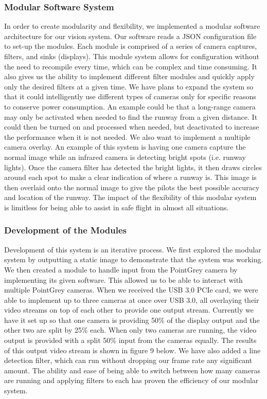 \documentclass[letterpaper,10pt,titlepage]{IEEEtran}
\begin{document}
   \subsubsection{Modular Software System}
   In order to create modularity and flexibility, we implemented a modular software architecture for our vision system. Our software reads a JSON configuration file to set-up the modules. Each module is comprised of a series of camera captures, filters, and sinks (displays). This module system allows for configuration without the need to recompile every time, which can be complex and time consuming. It also gives us the ability to implement different filter modules and quickly apply only the desired filters at a given time. We have plans to expand the system so that it could intelligently use different types of cameras only for specific reasons to conserve power consumption. An example could be that a long-range camera may only be activated when needed to find the runway from a given distance. It could then be turned on and processed when needed, but deactivated to increase the performance when it is not needed. We also want to implement a multiple camera overlay. An example of this system is having one camera capture the normal image while an infrared camera is detecting bright spots (i.e. runway lights). Once the camera filter has detected the bright lights, it then draws circles around each spot to make a clear indication of where a runway is. This image is then overlaid onto the normal image to give the pilots the best possible accuracy and location of the runway. The impact of the flexibility of this modular system is limitless for being able to assist in safe flight in almost all situations.\\
   
   \subsubsection{Development of the Modules}
Development of this system is an iterative process. We first explored the modular system by outputting a static image to demonstrate that the system was working. We then created a module to handle input from the PointGrey camera by implementing its given software. This allowed us to be able to interact with multiple PointGrey cameras. When we received the USB 3.0 PCIe card, we were able to implement up to three cameras at once over USB 3.0, all overlaying their video streams on top of each other to provide one output stream. Currently we have it set up so that one camera is providing 50\% of the display output and the other two are split by 25\% each. When only two cameras are running, the video output is provided with a split 50\% input from the cameras equally. The results of this output video stream is shown in figure 9 below. We have also added a line detection filter, which can run without dropping our frame rate any significant amount. The ability and ease of being able to switch between how many cameras are running and applying filters to each has proven the efficiency of our modular system. 
\end{document}
